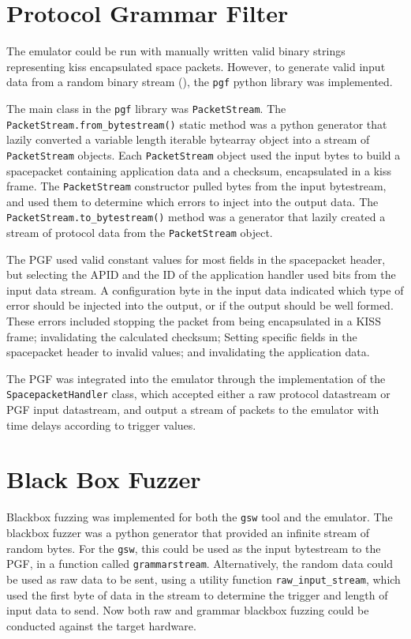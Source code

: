 \documentclass[../report.tex]{subfiles}
\begin{document}
\section{Protocol Grammar Filter}

The emulator could be run with manually written valid binary strings
representing kiss encapsulated space packets. However, to generate valid input
data from a random binary stream (), the \lstinline|pgf| python
library was implemented.

The main class in the \lstinline|pgf| library was \lstinline|PacketStream|. The
\lstinline|PacketStream.from_bytestream()| static method was a python generator
that lazily converted a variable length iterable bytearray object into a stream
of \lstinline|PacketStream| objects. Each \lstinline|PacketStream| object used
the input bytes to build a spacepacket containing application data and a
checksum, encapsulated in a kiss frame. The \lstinline|PacketStream| constructor
pulled bytes from the input bytestream, and used them to determine which errors
to inject into the output data. The \lstinline|PacketStream.to_bytestream()|
method was a generator that lazily created a stream of protocol data from the
\lstinline|PacketStream| object.

The PGF used valid constant values for most fields in the spacepacket header,
but selecting the APID and the ID of the application handler used bits from the
input data stream. A configuration byte in the input data indicated which type
of error should be injected into the output, or if the output should be well
formed. These errors included stopping the packet from being encapsulated in a
KISS frame; invalidating the calculated checksum; Setting specific fields in
the spacepacket header to invalid values; and invalidating the application
data.

The PGF was integrated into the emulator through the implementation of the
\lstinline|SpacepacketHandler| class, which accepted either a raw protocol
datastream or PGF input datastream, and output a stream of packets to the
emulator with time delays according to trigger values.


\section{Black Box Fuzzer}
Blackbox fuzzing was implemented for both the \lstinline|gsw| tool and the
emulator. The blackbox fuzzer was a python generator that provided an infinite
stream of random bytes. For the \lstinline|gsw|, this could be used as the input
bytestream to the PGF, in a function called \lstinline|grammarstream|.
Alternatively, the random data could be used as raw data to be sent, using a
utility function \lstinline|raw_input_stream|, which used the first byte of
data in the stream to determine the trigger and length of input data to send.
Now both raw and grammar blackbox fuzzing could be conducted against the target
hardware.
\end{document}
